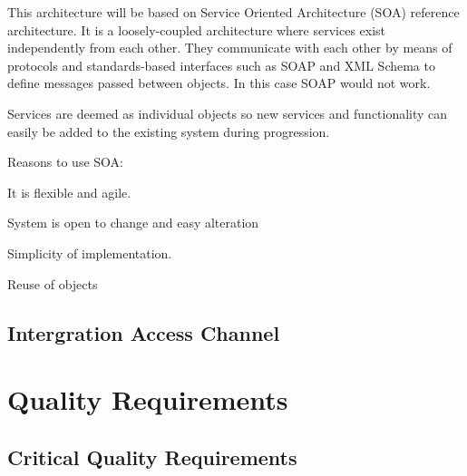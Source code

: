 \documentclass[a4paper,12pt]{report}
\begin{document}
	\begin{description}
\item This architecture will be based on Service Oriented Architecture (SOA) reference architecture. It is a loosely-coupled architecture where services exist independently from each other. They communicate with each other by means of protocols and standards-based interfaces such as SOAP and XML Schema to define messages passed between objects. In this case SOAP would not work.
\item Services are deemed as individual objects so new services and functionality can easily be added to the existing system during progression.
\item Reasons to use SOA:
\item[$\bullet$] It is flexible and agile.
\item[$\bullet$] System is open to change and easy alteration
\item[$\bullet$] Simplicity of implementation.
\item[$\bullet$] Reuse of objects

\end{description}
\subsection{Intergration Access Channel}


\section{Quality Requirements}
	\subsection{Critical Quality Requirements}
\end{document}
